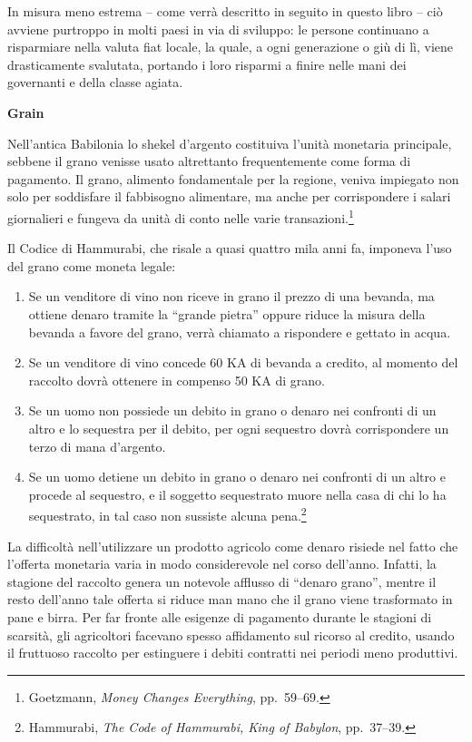 \documentclass[
  a5paper,
  smalldemyvopaper,10pt,twoside,onecolumn,openright,extrafontsizes,hidelinks]{memoir}
\renewenvironment{quote}%
               {\list{}{\rightmargin=.6cm\leftmargin=.6cm}%
                \itshape \item[]}%
               {\endlist}
\begin{document}
In misura meno estrema -- come verrà descritto in seguito in questo
libro -- ciò avviene purtroppo in molti paesi in via di sviluppo: le
persone continuano a risparmiare nella valuta fiat locale, la quale, a
ogni generazione o giù di lì, viene drasticamente svalutata, portando i
loro risparmi a finire nelle mani dei governanti e della classe agiata.

\textbf{Grain}

Nell'antica Babilonia lo shekel d'argento costituiva l'unità monetaria
principale, sebbene il grano venisse usato altrettanto frequentemente
come forma di pagamento. Il grano, alimento fondamentale per la regione,
veniva impiegato non solo per soddisfare il fabbisogno alimentare, ma
anche per corrispondere i salari giornalieri e fungeva da unità di conto
nelle varie transazioni.\footnote{Goetzmann, \emph{Money Changes
  Everything}, pp.~59--69.}

Il Codice di Hammurabi, che risale a quasi quattro mila anni fa,
imponeva l'uso del grano come moneta legale:

\begin{quote}
\begin{enumerate}
\def\labelenumi{\arabic{enumi}.}
\setcounter{enumi}{107}
\item
  Se un venditore di vino non riceve in grano il prezzo di una bevanda,
  ma ottiene denaro tramite la ``grande pietra'' oppure riduce la misura
  della bevanda a favore del grano, verrà chiamato a rispondere e
  gettato in acqua.
\item
  Se un venditore di vino concede 60 KA di bevanda a credito, al momento
  del raccolto dovrà ottenere in compenso 50 KA di grano.
\item
  Se un uomo non possiede un debito in grano o denaro nei confronti di
  un altro e lo sequestra per il debito, per ogni sequestro dovrà
  corrispondere un terzo di mana d'argento.
\item
  Se un uomo detiene un debito in grano o denaro nei confronti di un
  altro e procede al sequestro, e il soggetto sequestrato muore nella
  casa di chi lo ha sequestrato, in tal caso non sussiste alcuna
  pena.\footnote{Hammurabi, \emph{The Code of Hammurabi, King of
    Babylon}, pp.~37--39.}
\end{enumerate}
\end{quote}

La difficoltà nell'utilizzare un prodotto agricolo come denaro risiede
nel fatto che l'offerta monetaria varia in modo considerevole nel corso
dell'anno. Infatti, la stagione del raccolto genera un notevole afflusso
di ``denaro grano'', mentre il resto dell'anno tale offerta si riduce
man mano che il grano viene trasformato in pane e birra. Per far fronte
alle esigenze di pagamento durante le stagioni di scarsità, gli
agricoltori facevano spesso affidamento sul ricorso al credito, usando
il fruttuoso raccolto per estinguere i debiti contratti nei periodi meno
produttivi.
\end{document}
